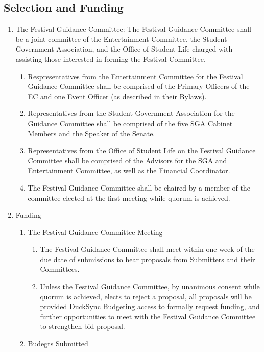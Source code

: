 \documentclass[12pt]{scrreprt}
\begin{document}
\subsection{Selection and Funding}
\begin{enumerate}
  \item The Festival Guidance Committee: The Festival Guidance Committee shall be a joint committee of the Entertainment Committee, the Student Government Association, and the Office of Student Life charged with assisting those interested in forming the Festival Committee.
    \begin{enumerate}
      \item Respresentatives from the Entertainment Committee for the Festival Guidance Committee shall be comprised of the Primary Officers of the EC and one Event Officer (as described in their Bylaws).
      \item Representatives from the Student Government Association for the Guidance Committee shall be comprised of the five SGA Cabinet Members and the Speaker of the Senate.
      \item Representatives from the Office of Student Life on the Festival Guidance Committee shall be comprised of the Advisors for the SGA and Entertainment Committee, as well as the Financial Coordinator.
      \item The Festival Guidance Committee shall be chaired by a member of the committee elected at the first meeting while quorum is achieved.
    \end{enumerate}
  \item Funding
    \begin{enumerate}
      \item The Festival Guidance Committee Meeting
        \begin{enumerate}
          \item The Festival Guidance Committee shall meet within one week of the due date of submissions to hear proposals from Submitters and their Committees.
          \item Unless the Festival Guidance Committee, by unanimous consent while quorum is achieved, elects to reject a proposal, all proposals will be provided DuckSync Budgeting access to formally request funding, and further opportunities to meet with the Festival Guidance Committee to strengthen bid proposal.
        \end{enumerate}
      \item Budegts Submitted
        \begin{enumerate}

\end{enumerate}
\end{enumerate}
\end{enumerate}
\end{document}
